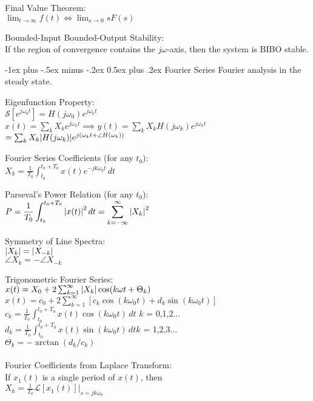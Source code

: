 \documentclass[12pt,landscape]{article}
\makeatletter
\renewcommand{\section}{\@startsection{section}{1}{0mm}%
                                {-1ex plus -.5ex minus -.2ex}%
                                {0.5ex plus .2ex}%
                                {\normalfont\normalsize\bfseries}}
\newcommand{\tab}{\hspace{0.02\textwidth}}
\newcommand{\ds}{\displaystyle}
\makeatother
\begin{document}
\begin{multicols*}{3}
Final Value Theorem:\\
\tab $\ds \lim_{t\rightarrow\infty} f(t) \Leftrightarrow \lim_{s\rightarrow 0} sF(s)$

Bounded-Input Bounded-Output Stability:\\
\tab If the region of convergence contains the $j\omega$-axis, then the system is BIBO stable.

\section{Fourier Series}
\tab Fourier analysis in the steady state.

Eigenfunction Property:\\
\tab $\mathcal{S}[e^{j\omega_0t}] = H(j\omega_0)e^{j\omega_0t}$\\
\tab $x(t) = \sum_k X_k e^{j\omega_kt} \implies y(t) = \sum_k X_k H(j\omega_k)e^{j\omega_kt}$\\\vspace{1mm}\hspace{2.5cm}$= \sum_k X_k \abs{H(j\omega_k)}e^{j(\omega_kt + \angle H(\omega_k))}$

Fourier Series Coefficients (for any $t_0$):\\
\tab $\ds X_k = \frac{1}{T_0}\int_{t_0}^{t_0 + T_0}x(t)e^{-jk\omega_0t}\,dt$

Parseval's Power Relation (for any $t_0$):\\
\tab $\ds P = \frac{1}{T_0} \int_{t_0}^{t_0 + T_0}\abs{x(t)}^2\,dt = \sum_{k = -\infty}^{\infty}\abs{X_k}^2$

Symmetry of Line Spectra:\\
\tab $\abs{X_k} = \abs{X_{-k}}$\\
\tab $\angle X_k = -\angle X_{-k}$

Trigonometric Fourier Series:\\
\tab $x(t) = X_0 + 2\sum_{k = 1}^{\infty}\abs{X_k}\cos(k\omega t + \Theta_k)$\\
\tab $x(t) = c_0 + 2\sum_{k = 1}^{\infty}[c_k\cos(k\omega_0 t) + d_k\sin(k\omega_0 t)]$\\
\tab $c_k = \frac{1}{T_0} \int_{t_0}^{t_0 + T_0}x(t)\cos(k\omega_0 t)\,dt$ \quad $k$ = 0,1,2$\ldots$\\
\tab $d_k = \frac{1}{T_0} \int_{t_0}^{t_0 + T_0}x(t)\sin(k\omega_0 t)\,dt$\quad $k$ = 1,2,3$\ldots$\\
\tab $\Theta_k = -\arctan(d_k/c_k)$
\\~\\
Fourier Coefficients from Laplace Transform:\\
\tab If $x_1(t)$ is a single period of $x(t)$, then\\
\tab $X_k = \frac{1}{T_0}\mathcal{L}[x_1(t)] \big\rvert_{s = jk\omega_0}$


\end{multicols*}
\end{document}

